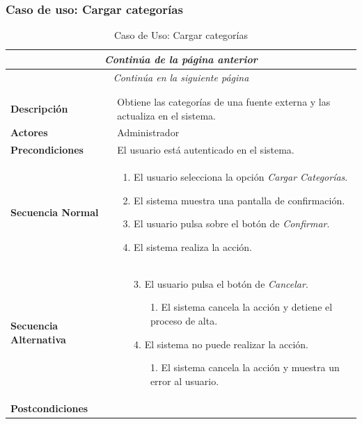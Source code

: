 \subsubsection*{Caso de uso: Cargar categorías }
\begin{longtable}{| p{4cm} | p{10cm} |}
\endfirsthead
\multicolumn{2}{c}{\textit{Continúa de la página anterior}}\\[12pt]
\hline
\endhead
\hline
\multicolumn{2}{c}{\textit{Continúa en la siguiente página}} \\
\endfoot
\hline
\caption{Caso de Uso: Cargar categorías}\label{fig:1}\\
\endlastfoot


\hline
\multicolumn{2}{|c|}{\textbf{CU$<$42$>$ - Cargar Categorías}} \\

\hline
\textbf{Descripción} &
Obtiene las categorías de una fuente externa y las actualiza en el sistema.\\

\hline
\textbf{Actores} &
Administrador\\

\hline
\textbf{Precondiciones} &
El usuario está autenticado en el sistema.\\

\hline
\textbf{Secuencia Normal} &\mbox{}\par\vspace{-\baselineskip}
\begin{enumerate}[leftmargin=0.7cm, topsep=0.1cm]
\item El usuario selecciona la opción \textit{Cargar Categorías}.
\item El sistema muestra una pantalla de confirmación.
\item El usuario pulsa sobre el botón de \textit{Confirmar}.
\item El sistema realiza la acción.
\end{enumerate}


\\
\hline
\textbf{Secuencia Alternativa} &\mbox{}\par\vspace{-\baselineskip}
\begin{enumerate}[leftmargin=0.9cm, topsep=0.1cm]
\item[3.] El usuario pulsa el botón de \textit{Cancelar}.
	\begin{itemize}
	\item[1.] El sistema cancela la acción y detiene el proceso de alta.
	\end{itemize}
\item[4.] El sistema no puede realizar la acción.
	\begin{itemize}
	\item[1.] El sistema cancela la acción y muestra un error al usuario.
	\end{itemize}
\end{enumerate}
\\

\hline
\textbf{Postcondiciones} & \\
\hline
\end{longtable}



